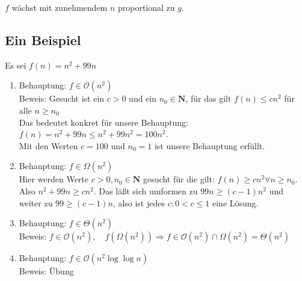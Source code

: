 \documentclass[ngerman,draft,parskip=half*,twoside]{scrreprt}
\theoremstyle{break}
\theoremstyle{nonumberbreak}
\newcommand*{\OO}{\mathcal{O}}      %
\begin{document}
$f$ wächst mit zunehmendem $n$ proportional zu $g$.

%
%

\subsection{Ein Beispiel}
Es sei $f(n) = n^2+99n$

\begin{enumerate}
\item   Behauptung: $f \in \OO(n^2)$\\
        Beweis: Gesucht ist ein $c>0$ und ein $n_0 \in \mathbf{N}$, für das gilt $f(n)\leq c n^2 $
        für alle $n\geq n_0$\\
        Das bedeutet konkret für unsere Behauptung:\\
        $f(n)= n^2+99n \leq n^2+99n^2 =100 n^2$.\\
        Mit den Werten $c=100$ und $n_0 = 1$ ist unsere Behauptung erfüllt.

\item   Behauptung: $f \in \Omega(n^2)$\\
        Hier werden Werte $c>0, n_0 \in \mathbf{N}$ gesucht für die gilt: $f(n) \geq c n^2\forall n\geq n_0$. Also $n^2+99n \geq
        c n^2$. Das läßt sich umformen zu $99n \geq (c-1)n^2$ und weiter zu $99 \geq (c-1)n$, also ist jedes $c\colon  0<c \leq 1$ eine
        Lösung.

\item   Behauptung: $f \in \Theta(n^2)$\\
        Beweis: $f \in \OO(n^2), \quad f(\Omega(n^2)) \Rightarrow f \in \OO(n^2)\cap \Omega(n^2)=\Theta(n^2)$

\item   Behauptung: $f \in \OO(n^2 \log\log n)$\\
        Beweis: Übung
\end{enumerate}
\end{document}
